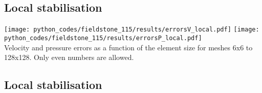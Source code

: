 \subsection*{Local stabilisation}

\begin{center}
\texttt{[image: python\_codes/fieldstone\_115/results/errorsV\_local.pdf]}
\texttt{[image: python\_codes/fieldstone\_115/results/errorsP\_local.pdf]}\\
{\captionfont Velocity and pressure errors as a function of the element size for meshes 6x6 to 128x128.
Only even numbers are allowed.}
\end{center}


\subsection*{Local stabilisation}




